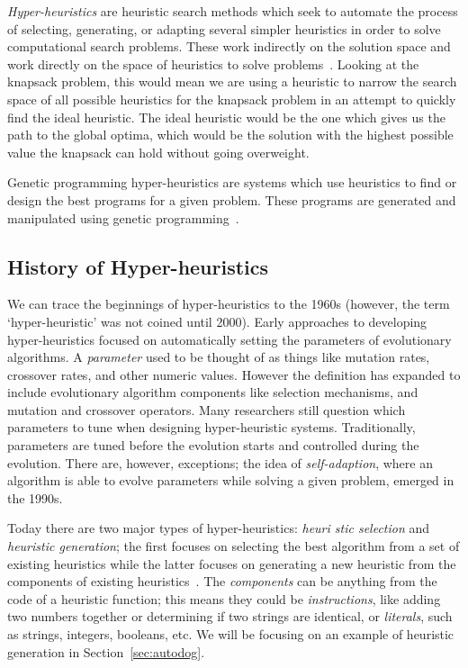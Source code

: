 \documentclass{sig-alternate}
\begin{document}
\textit{Hyper-heuristics} are heuristic search methods which seek to automate the process of selecting, generating, or adapting several simpler heuristics in order to solve computational search problems. These work indirectly on the solution space and work directly on the space of heuristics to solve problems~\cite{tauritz:tutorial}. Looking at the knapsack problem, this would mean we are using a heuristic to narrow the search space of all possible heuristics for the knapsack problem in an attempt to quickly find the ideal heuristic. The ideal heuristic would be the one which gives us the path to the global optima, which would be the solution with the highest possible value the knapsack can hold without going overweight.

Genetic programming hyper-heuristics are systems which use heuristics to find or design the best programs for a given problem. These programs are generated and manipulated using genetic programming~\cite{harris:2015}.

\subsection{History of Hyper-heuristics}
\label{sec:history}
We can trace the beginnings of hyper-heuristics to the 1960s (however, the term `hyper-heuristic' was not coined until 2000). Early approaches to developing hyper-heuristics focused on automatically setting the parameters of evolutionary algorithms. A \textit{parameter} used to be thought of as things like mutation rates, crossover rates, and other numeric values. However the definition has expanded to include evolutionary algorithm components like selection mechanisms, and mutation and crossover operators. Many researchers still question which parameters to tune when designing hyper-heuristic systems. Traditionally, parameters are tuned before the evolution starts and controlled during the evolution. There are, however, exceptions; the idea of \textit{self-adaption}, where an algorithm is able to evolve parameters while solving a given problem, emerged in the 1990s.~\cite{pappa:2014}

Today there are two major types of hyper-heuristics: \textit{heuri\- stic selection} and \textit{heuristic generation}; the first focuses on selecting the best algorithm from a set of existing heuristics while the latter focuses on generating a new heuristic from the components of existing heuristics~\cite{pappa:2014}. The \textit{components} can be anything from the code of a heuristic function; this means they could be \textit{instructions}, like adding two numbers together or determining if two strings are identical, or \textit{literals}, such as strings, integers, booleans, etc. We will be focusing on an example of heuristic generation in Section~\ref{sec:autodog}.
\end{document}
